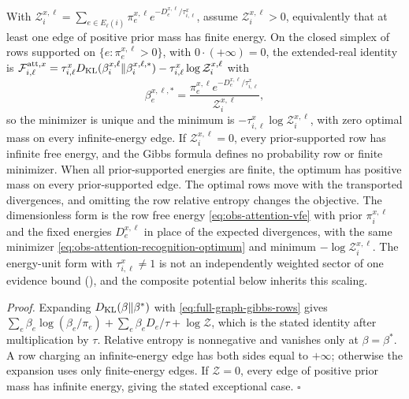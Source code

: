 With $\mathcal Z^{x,\ell}_i=\sum_{e\in E_\ell(i)}\pi^{x,\ell}_e
e^{-D^{x,\ell}_e/\tau^x_{i,\ell}}$, assume $\mathcal Z^{x,\ell}_i>0$, equivalently that at least
one edge of positive prior mass has finite energy. On the closed simplex of rows supported on
$\{e:\pi^{x,\ell}_e>0\}$, with $0\cdot(+\infty)=0$, the extended-real identity is
$\mathcal F^{\mathrm{att},x}_{i,\ell}=\tau^x_{i,\ell}D_{\mathrm{KL}}(\beta^{x,\ell}_i\Vert\beta^{x,\ell,*}_i)
-\tau^x_{i,\ell}\log\mathcal Z^{x,\ell}_i$ with
\begin{equation}
\beta^{x,\ell,*}_e=\frac{\pi^{x,\ell}_ee^{-D^{x,\ell}_e/\tau^x_{i,\ell}}}{\mathcal Z^{x,\ell}_i},
\label{eq:full-graph-gibbs-rows}
\end{equation}
so the minimizer is unique and the minimum is $-\tau^x_{i,\ell}\log\mathcal
Z^{x,\ell}_i$, with zero optimal mass on every infinite-energy edge. If $\mathcal Z^{x,\ell}_i=0$,
every prior-supported row has infinite free energy, and the Gibbs formula defines no probability row
or finite minimizer. When all prior-supported energies are finite, the optimum has positive mass on
every prior-supported edge. The optimal rows move with the transported divergences, and omitting
the row relative entropy changes the objective. The dimensionless form is the row
free energy \eqref{eq:obs-attention-vfe} with prior $\pi^{x,\ell}_i$ and the fixed
energies $D^{x,\ell}_e$ in place of the expected divergences, with the same minimizer
\eqref{eq:obs-attention-recognition-optimum} and minimum $-\log\mathcal
Z^{x,\ell}_i$. The energy-unit form with $\tau^x_{i,\ell}\ne1$ is not an
independently weighted sector of one evidence bound (),
and the composite potential below inherits this scaling. 

\noindent\emph{Proof.}
Expanding $D_{\mathrm{KL}}(\beta\Vert\beta^*)$ with \eqref{eq:full-graph-gibbs-rows} gives
$\sum_e\beta_e\log(\beta_e/\pi_e)+\sum_e\beta_eD_e/\tau+\log\mathcal Z$, which is the
stated identity after multiplication by $\tau$. Relative entropy is nonnegative and
vanishes only at $\beta=\beta^*$. A row charging an infinite-energy edge has both sides equal to
$+\infty$; otherwise the expansion uses only finite-energy edges. If $\mathcal Z=0$, every edge of
positive prior mass has infinite energy, giving the stated exceptional case. $\square$

